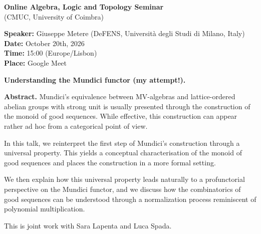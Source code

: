 \documentclass[11pt,a4paper]{article}
\begin{document}
\begin{center}
{\Large\bfseries Online Algebra, Logic and Topology Seminar}\\[4pt]
{\large (CMUC, University of Coimbra)}
\end{center}

\vspace{1em}
\textbf{Speaker:} Giuseppe Metere (DeFENS, Universit\`a degli Studi di Milano, Italy)\\
\textbf{Date:} October 20th, 2026\\
\textbf{Time:} 15:00 (Europe/Lisbon)\\
\textbf{Place:} Google Meet

\vspace{1.5em}
\begin{center}
{\Large\bfseries Understanding the Mundici functor (my attempt!).}
\end{center}
\vspace{1em}

\textbf{Abstract.} Mundici's equivalence between MV-algebras and lattice-ordered abelian groups with strong unit is usually presented through the construction of the monoid of good sequences. While effective, this construction can appear rather ad hoc from a categorical point of view.

\medskip
In this talk, we reinterpret the first step of Mundici's construction through a universal property. This yields a conceptual characterisation of the monoid of good sequences and places the construction in a more formal setting.

\medskip
We then explain how this universal property leads naturally to a profunctorial perspective on the Mundici functor, and we discuss how the combinatorics of good sequences can be understood through a normalization process reminiscent of polynomial multiplication.

\medskip
This is joint work with Sara Lapenta and Luca Spada.
\end{document}
